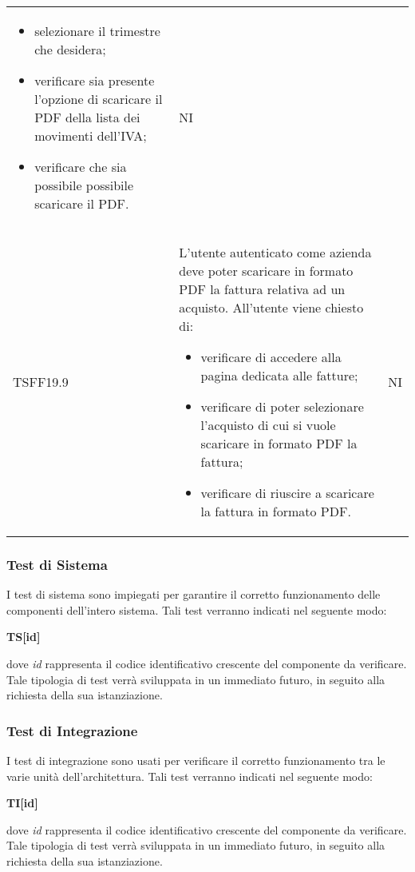 \begin{longtable}{ >{\centering}p{} >{\centering}p{}
			>{\centering}p{}}
\begin{itemize}
			\item selezionare il trimestre che desidera;
			\item verificare sia presente l'opzione di scaricare il PDF della lista
			dei movimenti dell'IVA;
			\item verificare che sia possibile possibile scaricare il PDF.
		\end{itemize}
		&	NI	\tabularnewline
		TSFF19.9	&	L'utente autenticato come azienda deve poter scaricare in formato PDF la
		fattura relativa ad un acquisto. All'utente viene chiesto di:
		\begin{itemize}
			\item verificare di accedere alla pagina dedicata alle fatture;
			\item verificare di poter selezionare l'acquisto di cui si vuole scaricare in 
			formato PDF la fattura;
			\item verificare di riuscire a scaricare la fattura in formato PDF.
		\end{itemize}	&	NI	
	
	
	\end{longtable}

\subsubsection{Test di Sistema}
I test di sistema sono impiegati per garantire il corretto funzionamento delle 
componenti dell'intero sistema. Tali test verranno indicati nel seguente modo:\\
	\centerline{\textbf{TS[id]}}
dove \textit{id} rappresenta il codice identificativo crescente del componente da
verificare.\\
Tale tipologia di test verrà sviluppata in un immediato futuro, in seguito alla richiesta della sua istanziazione.


\subsubsection{Test di Integrazione}
I test di integrazione sono usati per verificare il corretto funzionamento tra le
varie unità dell'architettura. Tali test verranno indicati nel seguente modo:\\
	\centerline{\textbf{TI[id]}}
dove \textit{id} rappresenta il codice identificativo crescente del componente da
verificare.\\
Tale tipologia di test verrà sviluppata in un immediato futuro, in seguito alla richiesta della sua istanziazione.

